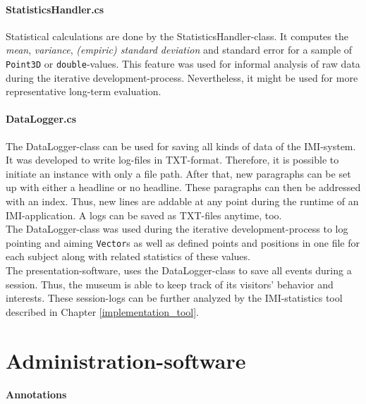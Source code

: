 
\paragraph{StatisticsHandler.cs} Statistical calculations are done by the StatisticsHandler-class. It computes the \textit{mean}, \textit{variance}, \textit{(empiric) standard deviation} and standard error for a sample of \texttt{Point3D} or \texttt{double}-values. This feature was used for informal analysis of raw data during the iterative development-process. Nevertheless, it might be used for more representative long-term evaluation. 


\paragraph{DataLogger.cs} The DataLogger-class can be used for saving all kinds of data of the \ac{IMI}-system. It was developed to write log-files in TXT-format. Therefore, it is possible to initiate an instance with only a file path. After that, new paragraphs can be set up with either a headline or no headline. These paragraphs can then be addressed with an index. Thus, new lines are addable at any point during the runtime of an \ac{IMI}-application. A logs can be saved as TXT-files anytime, too.
\\
The DataLogger-class was used during the iterative development-process to log pointing and aiming \texttt{Vector}s as well as defined points and positions in one file for each subject along with related statistics of these values.
\\
The presentation-software, uses the DataLogger-class to save all events during a session. Thus, the museum is able to keep track of its visitors' behavior and interests. These session-logs can be further analyzed by the \ac{IMI}-statistics tool described in Chapter \ref{implementation_tool}.


\section{Administration-software}
\label{implementation_administration}

\paragraph{Annotations}


